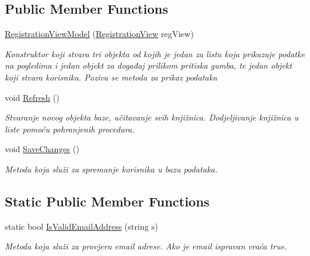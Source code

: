 \subsection*{Public Member Functions}
\begin{DoxyCompactItemize}
\item 
\mbox{\hyperlink{class_easy_library_application_1_1_w_p_f_1_1_view_model_1_1_registration_view_model_a7d12725646bc65a39ff67459a8579217}{Registration\+View\+Model}} (\mbox{\hyperlink{class_easy_library_application_1_1_w_p_f_1_1_view_1_1_registration_view}{Registration\+View}} reg\+View)
\begin{DoxyCompactList}\small\item\em Konstruktor koji stvara tri objekta od kojih je jedan za listu koja prikazuje podatke na pogledima i jedan objekt za događaj prilikom pritiska gumba, te jedan objekt koji stvara korisnika. Poziva se metoda za prikaz podataka \end{DoxyCompactList}\item 
void \mbox{\hyperlink{class_easy_library_application_1_1_w_p_f_1_1_view_model_1_1_registration_view_model_ad9ed8f4dc806f9117d652d88be4d472c}{Refresh}} ()
\begin{DoxyCompactList}\small\item\em Stvaranje novog objekta baze, učitavanje svih knjižnica. Dodjeljivanje knjižnica u liste pomoću pohranjenih procedura. \end{DoxyCompactList}\item 
void \mbox{\hyperlink{class_easy_library_application_1_1_w_p_f_1_1_view_model_1_1_registration_view_model_a6d3bfeaca68740bc278dde49eeab5ce9}{Save\+Changes}} ()
\begin{DoxyCompactList}\small\item\em Metoda koja služi za spremanje korisnika u bazu podataka. \end{DoxyCompactList}\end{DoxyCompactItemize}
\subsection*{Static Public Member Functions}
\begin{DoxyCompactItemize}
\item 
static bool \mbox{\hyperlink{class_easy_library_application_1_1_w_p_f_1_1_view_model_1_1_registration_view_model_a66ce4c46253fa72de9f3b0b9ea0cbe70}{Is\+Valid\+Email\+Address}} (string s)
\begin{DoxyCompactList}\small\item\em Metoda koja služi za provjeru email adrese. Ako je email ispravan vraća true. \end{DoxyCompactList}\end{DoxyCompactItemize}

